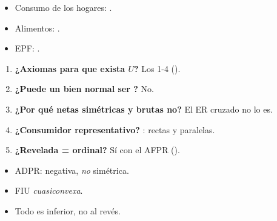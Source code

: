 \documentclass{article}
\begin{document}
\begin{columnas}
\anexorepaso
{}
\begin{itemize}
\item Consumo de los hogares: .
\item Alimentos: .
\item EPF: .
\end{itemize}
\begin{enumerate}
\item \textbf{¿Axiomas para que exista $U$?} Los 1-4 ().
\item \textbf{¿Puede un bien normal ser ?} No.
\item \textbf{¿Por qué netas simétricas y brutas no?} El ER cruzado no lo es.
\item \textbf{¿Consumidor representativo?} :  rectas y paralelas.
\item \textbf{¿Revelada = ordinal?} Sí con el AFPR ().
\end{enumerate}
\begin{trampa}
\begin{itemize}
\item ADPR:  negativa, \emph{no} simétrica.
\item FIU \emph{cuasiconvexa}.
\item Todo  es inferior, no al revés.
\end{itemize}
\end{trampa}

\end{columnas}
\end{document}
